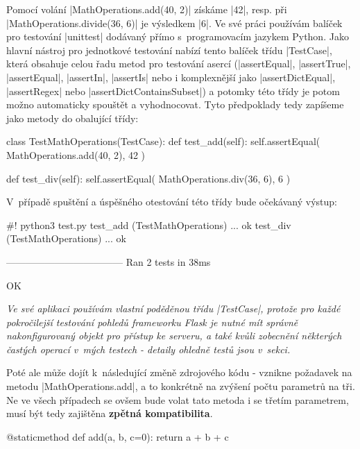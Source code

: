 \begin{sloppypar}
	Pomocí volání \ic|MathOperations.add(40, 2)| získáme \ic|42|, resp. při \ic|MathOperations.divide(36, 6)| je výsledkem \ic|6|. Ve své práci používám balíček pro testování \ic|unittest| dodávaný přímo s~programovacím jazykem Python. Jako hlavní nástroj pro jednotkové testování nabízí tento balíček třídu \ic|TestCase|, která obsahuje celou řadu metod pro testování asercí (\ic|assertEqual|, \ic|assertTrue|, \ic|assertEqual|, \ic|assertIn|, \ic|assertIs| nebo i komplexnější jako \ic|assertDictEqual|, \ic|assertRegex| nebo \ic|assertDictContainsSubset|) a potomky této třídy je potom možno automaticky spouštět a vyhodnocovat. Tyto předpoklady tedy zapíšeme jako metody do obalující třídy:
\end{sloppypar}

\begin{code}[caption={Základní TestCase pro třídu $MathOperations$}]
class TestMathOperations(TestCase):
	def test_add(self):
		self.assertEqual(
			MathOperations.add(40, 2),
			42
		)

	def test_div(self):
		self.assertEqual(
			MathOperations.div(36, 6),
			6
		)
\end{code}

V~případě spuštění a úspěšného otestování této třídy bude očekávaný výstup:

\begin{code}[language=sh,caption={Ukázka výstupu ze spuštění testů}]
#!\mbox{\textdollar} python3 test.py
test_add (TestMathOperations) ... ok
test_div (TestMathOperations) ... ok

------------------------------------
Ran 2 tests in 38ms

OK
\end{code}


{\itshape
	Ve své aplikaci používám vlastní poděděnou třídu \ic|TestCase|, protože pro každé pokročilejší testování pohledů frameworku Flask je nutné mít správně nakonfigurovaný objekt pro  přístup ke serveru, a také kvůli zobecnění některých častých operací v~mých testech - detaily ohledně testů jsou v~sekci.
}


Poté ale může dojít k~následující změně zdrojového k\'{o}du - vznikne požadavek na metodu \ic|MathOperations.add|, a to konkrétně na zvýšení počtu parametrů na tři. Ne ve všech případech se ovšem bude volat tato metoda i se třetím parametrem, musí být tedy zajištěna \textbf{zpětná kompatibilita}.

\begin{code}[caption={Vylepšená implementace metoda $MathOperations.add$}]
@staticmethod
def add(a, b, c=0):
	return a + b + c
\end{code}

